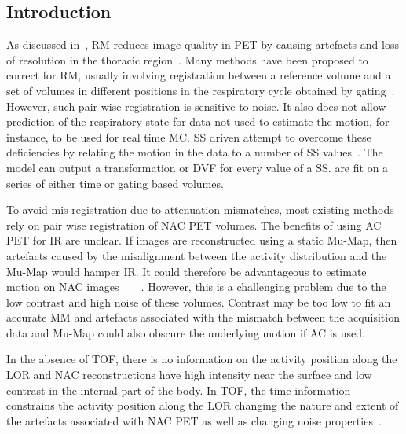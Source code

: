         \subsection{Introduction} \label{sec:impact_of_tof_on_respiratory_motion_model_estimation_using_pre_gated_no_intra_cycle_motion_nac_pet_introduction}
        As discussed in~, \gls{RM} reduces image quality in \gls{PET} by causing artefacts and loss of resolution in the thoracic region~. Many methods have been proposed to correct for \gls{RM}, usually involving registration between a reference volume and a set of volumes in different positions in the respiratory cycle obtained by gating~. However, such pair wise registration is sensitive to noise. It also does not allow prediction of the respiratory state for data not used to estimate the motion, for instance, to be used for real time \gls{MC}. \gls{SS} driven  attempt to overcome these deficiencies by relating the motion in the data to a number of \gls{SS} values~. The model can output a transformation or \gls{DVF} for every value of a \gls{SS}.  are fit on a series of either time or gating based volumes.

        To avoid mis-registration due to attenuation mismatches, most existing methods rely on pair wise registration of \gls{NAC} \gls{PET} volumes. The benefits of using \gls{AC} \gls{PET} for \gls{IR} are unclear. If images are reconstructed using a static \gls{Mu-Map}, then artefacts caused by the misalignment between the activity distribution and the \gls{Mu-Map} would hamper \gls{IR}. It could therefore be advantageous to estimate motion on \gls{NAC} images~~~~. However, this is a challenging problem due to the low contrast and high noise of these volumes. Contrast may be too low to fit an accurate \gls{MM} and artefacts associated with the mismatch between the acquisition data and \gls{Mu-Map} could also obscure the underlying motion if \gls{AC} is used.
        
        In the absence of \gls{TOF}, there is no information on the activity position along the \gls{LOR} and \gls{NAC} reconstructions have high intensity near the surface and low contrast in the internal part of the body. In \gls{TOF}, the time information constrains the activity position along the \gls{LOR} changing the nature and extent of the artefacts associated with \gls{NAC} \gls{PET} as well as changing noise properties~.
        

